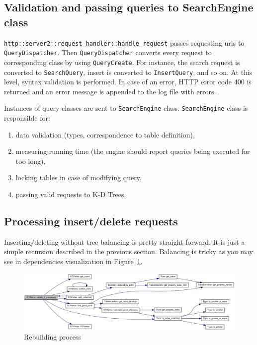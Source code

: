 \documentclass[10pt,a4paper]{article}
\begin{document}
\subsection{Validation and passing queries to SearchEngine class}

\verb|http::server2::request_handler::handle_request| passes requesting urls to \verb|QueryDispatcher|. Then \verb|QueryDispatcher| converts every request to corresponding class by using \verb|QueryCreate|. For instance, the search request is converted to \verb|SearchQuery|, insert is converted to \verb|InsertQuery|, and so on. At this level, syntax validation is performed. In case of an error, HTTP error code 400 is returned and an error message is appended to the log file with errors. 

Instances of query classes are sent to \verb|SearchEngine| class. \verb|SearchEngine| class is responsible for:
\begin{enumerate}
\item data validation (types, correspondence to table definition),
\item measuring running time (the engine should report queries being executed for too long),
\item locking tables in case of modifying query,
\item passing valid requests to K-D Trees.
\end{enumerate}

\subsection{Processing insert/delete requests}
\label{chapter:processing}

Inserting/deleting without tree balancing is pretty straight forward. It is just a simple recursion described in the previous section. Balancing is tricky as you may see in dependencies visualization in Figure~\ref{fig:rebuild}.

\begin{figure}[h!]
\centering
  \includegraphics[width=16cm]{rebuild}
  \caption{Rebuilding process}
  \label{fig:rebuild}
\end{figure}
\end{document}
